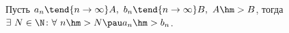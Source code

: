 \label{16}
Пусть $a_n\tend{n\to\infty}A,\ b_n \tend{n\to\infty}B,\ A\hm>B$, тогда $\exists\  N\in \N\colon \forall\  n\hm>N \pau a_n\hm>b_n$.
